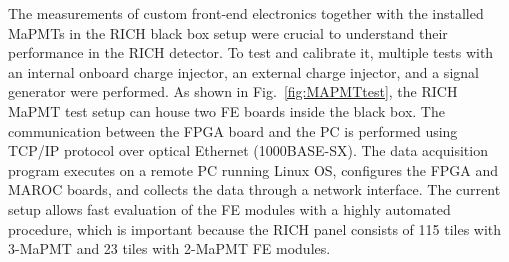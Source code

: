 The measurements of custom front-end electronics together with the installed MaPMTs in the RICH black box setup were crucial to understand their performance in the RICH detector.
To test and calibrate it, multiple tests with an internal onboard charge injector, an external charge injector, and a signal generator were performed.
As shown in Fig.~\ref{fig:MAPMTtest}, the RICH MaPMT test setup can house two FE boards inside the black box.
The communication between the FPGA board and the PC is performed using TCP/IP protocol over optical Ethernet (1000BASE-SX).
The data acquisition program executes on a remote PC running Linux OS, configures the FPGA and MAROC boards, and collects the data through a network interface.
The current setup allows fast evaluation of the FE modules with a highly automated procedure, which is important because the RICH panel consists of 115 tiles with 3-MaPMT and 23 tiles with 2-MaPMT FE modules.

